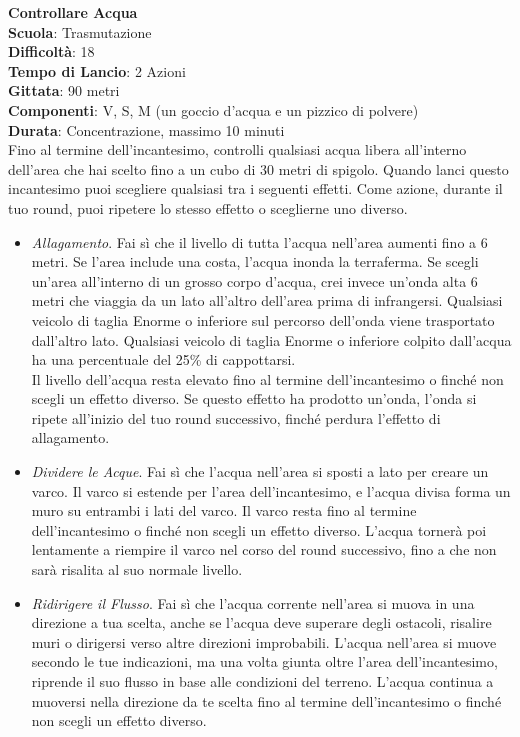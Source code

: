 \begin{multicols}{2}
\medskip\textbf{Controllare Acqua}\\
\textbf{Scuola}: Trasmutazione\\
\textbf{Difficoltà}: 18\\
\textbf{Tempo di Lancio}: 2 Azioni\\
\textbf{Gittata}: 90 metri\\
\textbf{Componenti}: V, S, M (un goccio d'acqua e un pizzico di polvere)\\
\textbf{Durata}: Concentrazione, massimo 10 minuti\\
Fino al termine dell'incantesimo, controlli qualsiasi acqua libera all'interno dell'area che hai scelto fino a un cubo di 30 metri di spigolo. Quando lanci questo incantesimo puoi scegliere qualsiasi tra i seguenti effetti. Come azione, durante il tuo round, puoi ripetere lo stesso effetto o sceglierne uno diverso.\\
\begin{itemize}
\item 
\textit{Allagamento}. Fai sì che il livello di tutta l'acqua nell'area aumenti fino a 6 metri. Se l'area include una costa, l'acqua inonda la terraferma. Se scegli un'area all'interno di un grosso corpo d'acqua, crei invece un'onda alta 6 metri che viaggia da un lato all'altro dell'area prima di infrangersi. Qualsiasi veicolo di taglia Enorme o inferiore sul percorso dell'onda viene trasportato dall'altro lato. Qualsiasi veicolo di taglia Enorme o inferiore colpito dall'acqua ha una percentuale del 25\% di cappottarsi.\\
Il livello dell'acqua resta elevato fino al termine dell'incantesimo o finché non scegli un effetto diverso. Se questo effetto ha prodotto un'onda, l'onda si ripete all'inizio del tuo round successivo, finché perdura l'effetto di allagamento.\\
\item 
\textit{Dividere le Acque}. Fai sì che l'acqua nell'area si sposti a lato per creare un varco. Il varco si estende per l'area dell'incantesimo, e l'acqua divisa forma un muro su entrambi i lati del varco. Il varco resta fino al termine dell'incantesimo o finché non scegli un effetto diverso. L'acqua tornerà poi lentamente a riempire il varco nel corso del round successivo, fino a che non sarà risalita al suo normale livello.
\item 
\textit{Ridirigere il Flusso}. Fai sì che l'acqua corrente nell'area si muova in una direzione a tua scelta, anche se l'acqua deve superare degli ostacoli, risalire muri o dirigersi verso altre direzioni improbabili. L'acqua nell'area si muove secondo le tue indicazioni, ma una volta giunta oltre l'area dell'incantesimo, riprende il suo flusso in base alle condizioni del terreno. L'acqua continua a muoversi nella direzione da te scelta fino al termine dell'incantesimo o finché non scegli un effetto diverso.

\end{itemize}
\end{multicols}
